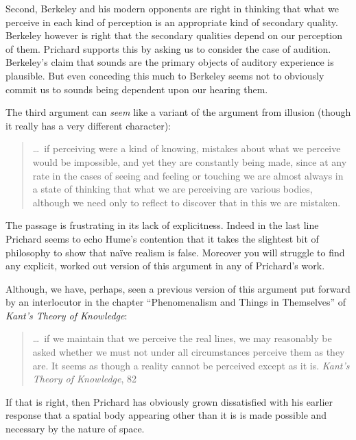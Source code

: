 \documentclass[11pt]{article}
\begin{document}
Second, Berkeley and his modern opponents are right in thinking that what we perceive in each kind of perception is an appropriate kind of secondary quality. Berkeley however is right that the secondary qualities depend on our perception of them. Prichard supports this by asking us to consider the case of audition. Berkeley's claim that sounds are the primary objects of auditory experience is plausible. But even conceding this much to Berkeley seems not to obviously commit us to sounds being dependent upon our hearing them.

The third argument can \emph{seem} like a variant of the argument from illusion (though it really has a very different character):
\begin{quote}
    \ldots\ if perceiving were a kind of knowing, mistakes about what we perceive would be impossible, and yet they are constantly being made, since at any rate in the cases of seeing and feeling or touching we are almost always in a state of thinking that what we are perceiving are various bodies, although we need only to reflect to discover that in this we are mistaken.
\end{quote}

The passage is frustrating in its lack of explicitness. Indeed in the last line Prichard seems to echo Hume's contention that it takes the slightest bit of philosophy to show that naïve realism is false. Moreover you will struggle to find any explicit, worked out version of this argument in any of Prichard's work.

Although, we have, perhaps, seen a previous version of this argument put forward by an interlocutor in the chapter ``Phenomenalism and Things in Themselves'' of \emph{Kant's Theory of Knowledge}:
\begin{quote}
    \ldots\ if we maintain that we perceive the real lines, we may reasonably be asked whether we must not under all circumstances perceive them as they are. It seems as though a reality cannot be perceived except as it is. \emph{Kant's Theory of Knowledge}, 82
\end{quote}
If that is right, then Prichard has obviously grown dissatisfied with his earlier response that a spatial body appearing other than it is is made possible and necessary by the nature of space.
\end{document}
